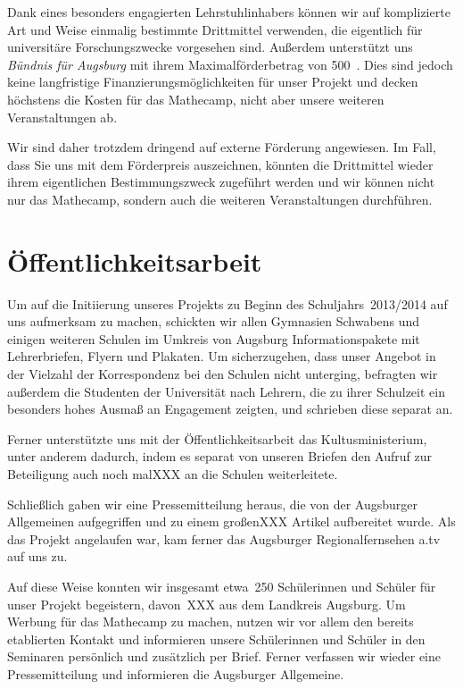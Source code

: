 \documentclass[12pt]{zettel}
\begin{document}
Dank eines besonders engagierten Lehrstuhlinhabers können wir auf komplizierte
Art und Weise einmalig bestimmte Drittmittel verwenden, die eigentlich für
universitäre Forschungszwecke vorgesehen sind. Außerdem unterstützt uns
\emph{Bündnis für Augsburg} mit ihrem Maximalförderbetrag von 500~\texteuro.
Dies sind jedoch keine langfristige Finanzierungsmöglichkeiten für unser
Projekt und decken höchstens die Kosten für das Mathecamp, nicht aber unsere
weiteren Veranstaltungen ab.

Wir sind daher trotzdem dringend auf externe Förderung angewiesen. Im Fall,
dass Sie uns mit dem Förderpreis auszeichnen, könnten die Drittmittel wieder
ihrem eigentlichen Bestimmungszweck zugeführt werden und wir können nicht nur
das Mathecamp, sondern auch die weiteren Veranstaltungen durchführen.


\section{Öffentlichkeitsarbeit}

Um auf die Initiierung unseres Projekts zu Beginn des Schuljahrs~2013/2014 auf
uns aufmerksam zu machen, schickten wir allen Gymnasien Schwabens und einigen
weiteren Schulen im Umkreis von Augsburg Informationspakete mit Lehrerbriefen,
Flyern und Plakaten. Um sicherzugehen, dass unser Angebot in der
Vielzahl der Korrespondenz bei den Schulen nicht unterging, befragten wir außerdem
die Studenten der Universität nach Lehrern, die zu ihrer Schulzeit ein
besonders hohes Ausmaß an Engagement zeigten, und schrieben diese separat an.

Ferner unterstützte uns mit der Öffentlichkeitsarbeit das Kultusministerium,
unter anderem dadurch, indem es separat von unseren Briefen den Aufruf zur
Beteiligung auch noch malXXX an die Schulen weiterleitete.

Schließlich gaben wir eine Pressemitteilung heraus, die von der
Augsburger Allgemeinen aufgegriffen und zu einem großenXXX Artikel aufbereitet
wurde. Als das Projekt angelaufen war, kam ferner das Augsburger
Regionalfernsehen a.tv auf uns zu.

Auf diese Weise konnten wir insgesamt etwa~250 Schülerinnen und Schüler für
unser Projekt begeistern, davon~XXX aus dem Landkreis Augsburg. Um Werbung für
das Mathecamp zu machen, nutzen wir vor allem den bereits etablierten Kontakt
und informieren unsere Schülerinnen und Schüler in den Seminaren persönlich und
zusätzlich per Brief. Ferner verfassen wir wieder eine Pressemitteilung und
informieren die Augsburger Allgemeine.
\end{document}
